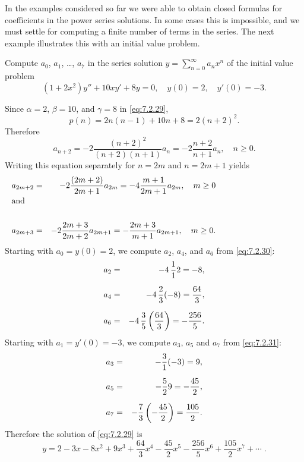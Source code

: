 In the examples considered so far we were able to obtain closed formulas for coefficients in the
power series solutions. In some cases this is impossible, and we must settle for computing a finite
number of terms in the series. The next example illustrates this with an initial value problem.

\begin{example}
  \label{example:7.2.4}\rm Compute $a_{0}$, $a_{1}$, \dots, $a_{7}$ in the series solution
  $y=\sum_{n=0}^{\infty}a_{n}x^{n}$ of the initial value problem
  \begin{equation}
    \label{eq:7.2.29}(1+2x^{2})y''+10xy'+8y=0,\quad y(0)=2,\quad y'(0)=-3.
  \end{equation}
\end{example}

\begin{examplesolution}
\solution Since $\alpha=2$, $\beta=10$, and $\gamma=8$ in \eqref{eq:7.2.29},
\[
  p(n)=2n(n-1)+10n+8=2(n+2)^{2}.
\]
Therefore
\[
  a_{n+2}=-2{\frac{(n+2)^{2}}{(n+2)(n+1)}}a_{n}=-2{\frac{n+2}{n+1}}a_{n},\quad n\ge0.
\]
Writing this equation separately for $n=2m$ and $n=2m+1$ yields
\begin{eqnarray}
  a_{2m+2}                                     & = & -2{\frac{(2m+2)}{2m+1}}a_{2m}=-4{\frac{m+1}{2m+1}}a_{2m},\quad m\ge0\label{eq:7.2.30} \\
  \noalign{\hspace*{-15pt}\mbox{and}}\nonumber                                                                                             \\
  a_{2m+3}                                     & = & -2{\frac{2m+3}{2m+2}}a_{2m+1}=-\frac{2m+3}{m+1}a_{2m+1},\quad m\ge0.\label{eq:7.2.31}
\end{eqnarray}
Starting with $a_{0}=y(0)=2$, we compute $a_{2}$, $a_{4}$, and $a_{6}$ from \eqref{eq:7.2.30}:
\begin{eqnarray*}
  a_{2} & = & -4\,\frac{1}{1}2=-8,              \\[2\jot]
  a_{4} & = & -4\,\frac{2}{3}(-8)=\frac{64}{3}, \\[2\jot]
  a_{6} & = & -4\,\frac{3}{5}\left(\frac{64}{3}\right)=-\frac{256}{5}.
\end{eqnarray*}
Starting with $a_{1}=y'(0)=-3$, we compute $a_{3}$, $a_{5}$ and $a_{7}$ from \eqref{eq:7.2.31}:
\begin{eqnarray*}
  a_{3} & = & -\frac{3}{1}(-3)=9,          \\[2\jot]
  a_{5} & = & -\frac{5}{2}9=-\frac{45}{2}, \\[2\jot]
  a_{7} & = & -\frac{7}{3}\left(-\frac{45}{2}\right)=\frac{105}{2}.
\end{eqnarray*}
Therefore the solution of \eqref{eq:7.2.29} is
\[
  y=2-3x-8x^{2}+9x^{3}+\frac{64}{3}x^{4}-\frac{45}{2}x^{5}-\frac{256}{5}x^{6}+\frac{105}{2}x^{7}+\cdots\;.
\]
\end{examplesolution}

